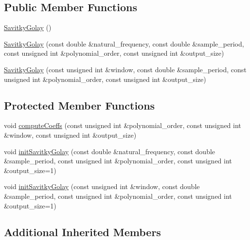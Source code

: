 \subsection*{Public Member Functions}
\begin{DoxyCompactItemize}
\item 
\hyperlink{classeigen__control__toolbox_1_1_savitky_golay_a93b69082ddae291c2d6e12670fe91d68}{Savitky\+Golay} ()
\item 
\hyperlink{classeigen__control__toolbox_1_1_savitky_golay_a46eafa63bbe9866f323f2394c72ac998}{Savitky\+Golay} (const double \&natural\+\_\+frequency, const double \&sample\+\_\+period, const unsigned int \&polynomial\+\_\+order, const unsigned int \&output\+\_\+size)
\item 
\hyperlink{classeigen__control__toolbox_1_1_savitky_golay_acaa769bb795a34c2ec4bd5857e6c0923}{Savitky\+Golay} (const unsigned int \&window, const double \&sample\+\_\+period, const unsigned int \&polynomial\+\_\+order, const unsigned int \&output\+\_\+size)
\end{DoxyCompactItemize}
\subsection*{Protected Member Functions}
\begin{DoxyCompactItemize}
\item 
void \hyperlink{classeigen__control__toolbox_1_1_savitky_golay_ae1767a408504913880b7c742eb4e4831}{compute\+Coeffs} (const unsigned int \&polynomial\+\_\+order, const unsigned int \&window, const unsigned int \&output\+\_\+size)
\item 
void \hyperlink{classeigen__control__toolbox_1_1_savitky_golay_a499c308c1672cedc332e92116257c673}{init\+Savitky\+Golay} (const double \&natural\+\_\+frequency, const double \&sample\+\_\+period, const unsigned int \&polynomial\+\_\+order, const unsigned int \&output\+\_\+size=1)
\item 
void \hyperlink{classeigen__control__toolbox_1_1_savitky_golay_a9b0b89e15d57b7737c01610d1e5e7c4c}{init\+Savitky\+Golay} (const unsigned int \&window, const double \&sample\+\_\+period, const unsigned int \&polynomial\+\_\+order, const unsigned int \&output\+\_\+size=1)
\end{DoxyCompactItemize}
\subsection*{Additional Inherited Members}


